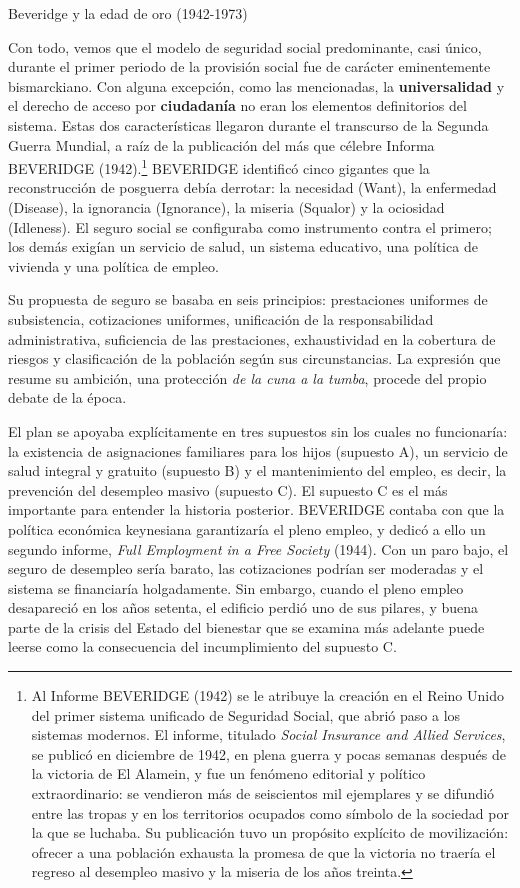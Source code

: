 \documentclass[10pt,a4paper]{article}
\begin{document}
Beveridge y la edad de oro (1942-1973)

Con todo, vemos que el modelo de seguridad social predominante, casi único, durante el primer periodo de la provisión social fue de carácter eminentemente bismarckiano. Con alguna excepción, como las mencionadas, la \textbf{universalidad} y el derecho de acceso por \textbf{ciudadanía} no eran los elementos definitorios del sistema. Estas dos características llegaron durante el transcurso de la Segunda Guerra Mundial, a raíz de la publicación del más que célebre Informa BEVERIDGE (1942).\footnote{%
    Al Informe BEVERIDGE (1942) se le atribuye la creación en el Reino Unido del primer sistema unificado de Seguridad Social, que abrió paso a los sistemas modernos. El informe, titulado \textit{Social Insurance and Allied Services}, se publicó en diciembre de 1942, en plena guerra y pocas semanas después de la victoria de El Alamein, y fue un fenómeno editorial y político extraordinario: se vendieron más de seiscientos mil ejemplares y se difundió entre las tropas y en los territorios ocupados como símbolo de la sociedad por la que se luchaba. Su publicación tuvo un propósito explícito de movilización: ofrecer a una población exhausta la promesa de que la victoria no traería el regreso al desempleo masivo y la miseria de los años treinta.
} BEVERIDGE identificó cinco gigantes que la reconstrucción de posguerra debía derrotar: la necesidad (Want), la enfermedad (Disease), la ignorancia (Ignorance), la miseria (Squalor) y la ociosidad (Idleness). El seguro social se configuraba como instrumento contra el primero; los demás exigían un servicio de salud, un sistema educativo, una política de vivienda y una política de empleo. 

Su propuesta de seguro se basaba en seis principios: prestaciones uniformes de subsistencia, cotizaciones uniformes, unificación de la responsabilidad administrativa, suficiencia de las prestaciones, exhaustividad en la cobertura de riesgos y clasificación de la población según sus circunstancias. La expresión que resume su ambición, una protección \textit{de la cuna a la tumba}, procede del propio debate de la época.

El plan se apoyaba explícitamente en tres supuestos sin los cuales no funcionaría: la existencia de asignaciones familiares para los hijos (supuesto A), un servicio de salud integral y gratuito (supuesto B) y el mantenimiento del empleo, es decir, la prevención del desempleo masivo (supuesto C). El supuesto C es el más importante para entender la historia posterior. BEVERIDGE contaba con que la política económica keynesiana garantizaría el pleno empleo, y dedicó a ello un segundo informe, \textit{Full Employment in a Free Society} (1944). Con un paro bajo, el seguro de desempleo sería barato, las cotizaciones podrían ser moderadas y el sistema se financiaría holgadamente. Sin embargo, cuando el pleno empleo desapareció en los años setenta, el edificio perdió uno de sus pilares, y buena parte de la crisis del Estado del bienestar que se examina más adelante puede leerse como la consecuencia del incumplimiento del supuesto C.
\end{document}
